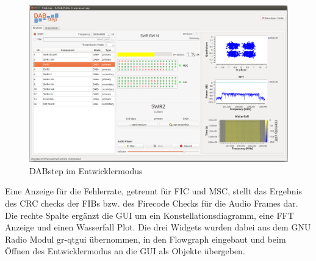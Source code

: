 \begin{figure}[htb]
\centering
  \includegraphics[width=\textwidth]{figures/GUI_dev_mode.png}
	\caption{DABstep im Entwicklermodus}
	\label{fig:GUI_dev_mode}
\end{figure}

Eine Anzeige für die Fehlerrate, getrennt für FIC und MSC, stellt das Ergebnis des CRC checks der FIBs bzw. des Firecode Checks für die Audio Frames dar. Die rechte Spalte ergänzt die GUI um ein Konstellationsdiagramm, eine FFT Anzeige und einen Wasserfall Plot. Die drei Widgets wurden dabei aus dem GNU Radio Modul gr-qtgui übernommen, in den Flowgraph eingebaut und beim Öffnen des Entwicklermodus an die GUI als Objekte übergeben.